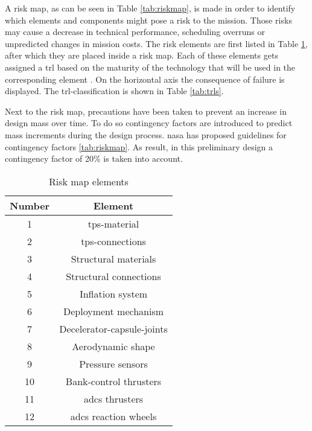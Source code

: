 A risk map, as can be seen in Table \ref{tab:riskmap}, is made in order to identify which elements and components might pose a risk to the mission. Those risks may cause a decrease in technical performance, scheduling overruns or unpredicted changes in mission costs. The risk elements are first listed in Table \ref{tab:riskmapelements}, after which they are placed inside a risk map. Each of these elements gets assigned a \gls{trl} based on the maturity of the technology that will be used in the corresponding element \cite{NASA2007}. On the horizontal axis the consequence of failure is displayed. The \gls{trl}-classification is shown in Table \ref{tab:trls}.

Next to the risk map, precautions have been taken to prevent an increase in design mass over time. To do so contingency factors are introduced to predict mass increments during the design process. \gls{nasa} has proposed guidelines for contingency factors \ref{tab:riskmap}. As result, in this preliminary design a contingency factor of 20\% is taken into account.

\begin{table}[h]
	\centering
	\caption{Risk map elements}
	\label{tab:riskmapelements}
	\begin{tabular}{|c|c|}
		\hline 
		\textbf{Number} & \textbf{Element} \\ \hline \hline
		1 & \acrlong{tps}-material \\
		2 & \acrlong{tps}-connections\\
		3 & Structural materials\\
		4 & Structural connections\\
		5 & Inflation system	\\	
		6 & Deployment mechanism\\
		7 & Decelerator-capsule-joints\\
		8 & Aerodynamic shape\\
		9 & Pressure sensors\\
		10 & Bank-control thrusters\\
		11 & \gls{adcs} thrusters\\
		12 & \gls{adcs} reaction wheels\\
		\hline
	\end{tabular}
\end{table}

